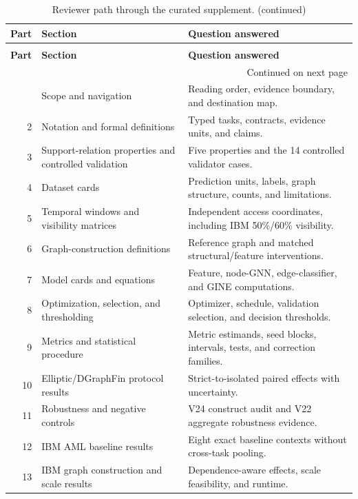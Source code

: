 \begingroup
\footnotesize
\setlength{\tabcolsep}{3pt}
\renewcommand{\arraystretch}{1.10}
\begin{longtable}{@{}r p{} p{}@{}}
\caption{Reviewer path through the curated supplement.}\label{tab:s-navigation}\\
\toprule
\textbf{Part} & \textbf{Section} & \textbf{Question answered} \\
\midrule
\endfirsthead
\caption[]{Reviewer path through the curated supplement. (continued)}\\
\toprule
\textbf{Part} & \textbf{Section} & \textbf{Question answered} \\
\midrule
\endhead
\midrule
\multicolumn{3}{r}{\footnotesize Continued on next page}\\
\endfoot
\bottomrule
\endlastfoot
1 & Scope and navigation & Reading order, evidence boundary, and destination map. \\
2 & Notation and formal definitions & Typed tasks, contracts, evidence units, and claims. \\
3 & Support-relation properties and controlled validation & Five properties and the 14 controlled validator cases. \\
4 & Dataset cards & Prediction units, labels, graph structure, counts, and limitations. \\
5 & Temporal windows and visibility matrices & Independent access coordinates, including IBM 50\%/60\% visibility. \\
6 & Graph-construction definitions & Reference graph and matched structural/feature interventions. \\
7 & Model cards and equations & Feature, node-GNN, edge-classifier, and GINE computations. \\
8 & Optimization, selection, and thresholding & Optimizer, schedule, validation selection, and decision thresholds. \\
9 & Metrics and statistical procedure & Metric estimands, seed blocks, intervals, tests, and correction families. \\
10 & Elliptic/DGraphFin protocol results & Strict-to-isolated paired effects with uncertainty. \\
11 & Robustness and negative controls & V24 construct audit and V22 aggregate robustness evidence. \\
12 & IBM AML baseline results & Eight exact baseline contexts without cross-task pooling. \\
13 & IBM graph construction and scale results & Dependence-aware effects, scale feasibility, and runtime. \\

\end{longtable}
